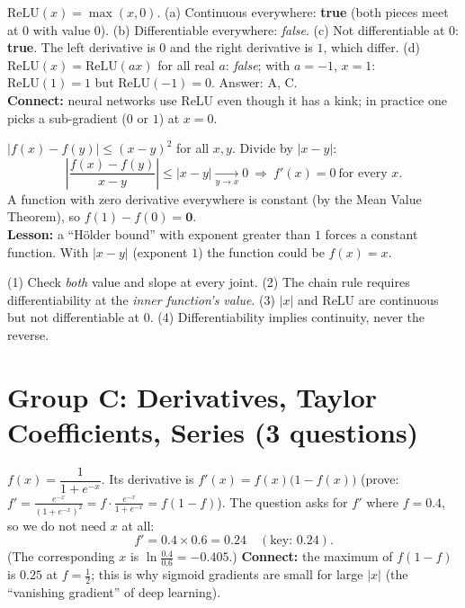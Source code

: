 \documentclass[11pt,a4paper]{article}
\begin{document}
\begin{example}
$\mathrm{ReLU}(x)=\max(x,0)$. (a) Continuous everywhere: \textbf{true} (both pieces meet at $0$ with value $0$). (b) Differentiable everywhere: \emph{false}. (c) Not differentiable at $0$: \textbf{true}. The left derivative is $0$ and the right derivative is $1$, which differ. (d) $\mathrm{ReLU}(x)=\mathrm{ReLU}(ax)$ for all real $a$: \emph{false}; with $a=-1$, $x=1$: $\mathrm{ReLU}(1)=1$ but $\mathrm{ReLU}(-1)=0$. Answer: A, C.\\
\textbf{Connect:} neural networks use ReLU even though it has a kink; in practice one picks a sub-gradient ($0$ or $1$) at $x=0$.
\end{example}

\begin{example}
$|f(x)-f(y)|\le(x-y)^2$ for all $x,y$. Divide by $|x-y|$:
\[\left|\frac{f(x)-f(y)}{x-y}\right|\le|x-y|\xrightarrow[y\to x]{}0\ \Rightarrow\ f'(x)=0\ \text{for every }x.\]
A function with zero derivative everywhere is constant (by the Mean Value Theorem), so $f(1)-f(0)=\mathbf0$.\\
\textbf{Lesson:} a ``H\"older bound'' with exponent greater than $1$ forces a constant function. With $|x-y|$ (exponent $1$) the function could be $f(x)=x$.
\end{example}

\begin{trap}
(1) Check \emph{both} value and slope at every joint. (2) The chain rule requires differentiability at the \emph{inner function's value}. (3) $|x|$ and $\mathrm{ReLU}$ are continuous but not differentiable at $0$. (4) Differentiability implies continuity, never the reverse.
\end{trap}

\section{Group C: Derivatives, Taylor Coefficients, Series (3 questions)}

\begin{example}
$f(x)=\dfrac1{1+e^{-x}}$. Its derivative is $f'(x)=f(x)\bigl(1-f(x)\bigr)$ (prove: $f'=\frac{e^{-x}}{(1+e^{-x})^2}=f\cdot\frac{e^{-x}}{1+e^{-x}}=f(1-f)$). The question asks for $f'$ where $f=0.4$, so we do not need $x$ at all:
\[f'=0.4\times0.6=\mathbf{0.24}\quad(\text{key: }0.24).\]
(The corresponding $x$ is $\ln\frac{0.4}{0.6}=-0.405$.) \textbf{Connect:} the maximum of $f(1-f)$ is $0.25$ at $f=\frac12$; this is why sigmoid gradients are small for large $|x|$ (the ``vanishing gradient'' of deep learning).
\end{example}
\end{document}
